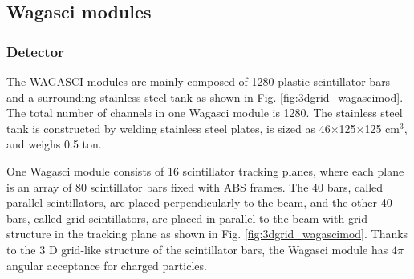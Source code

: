 \subsection{Wagasci modules}
\subsubsection{Detector}
The WAGASCI modules are mainly composed of 1280 plastic scintillator bars and a surrounding stainless steel tank as shown in Fig. \ref{fig:3dgrid_wagascimod}.
The total number of channels in one Wagasci module is 1280.
The stainless steel tank is constructed by welding stainless steel plates, is sized as 46$\times$125$\times$125 cm$^{3}$, and weighs 0.5 ton. 


One Wagasci module consists of 16 scintillator tracking planes, where each plane is an array of 80 scintillator bars fixed with ABS frames.
The 40 bars, called parallel scintillators, are placed perpendicularly to the beam, and the other 40 bars, called grid scintillators, are placed in parallel to the beam with grid structure in the tracking plane as shown in Fig. \ref{fig:3dgrid_wagascimod}.
Thanks to the 3 D grid-like structure of the scintillator bars, 
the Wagasci module has $4\pi$ angular acceptance for charged particles.

